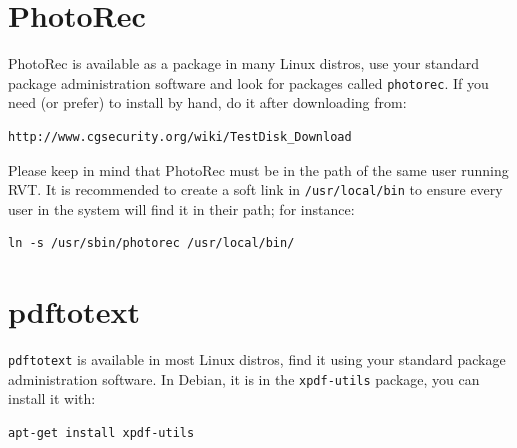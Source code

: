 \documentclass[a4paper,11pt,oneside]{report}
\begin{document}
\section{PhotoRec} \label{anx:photorec}

PhotoRec is available as a package in many Linux distros, use your standard package administration software and look for packages called \texttt{photorec}. If you need (or prefer) to install by hand, do it after downloading from:
\begin{verbatim}
http://www.cgsecurity.org/wiki/TestDisk_Download
\end{verbatim}

Please keep in mind that PhotoRec must be in the path of the same user running RVT. It is recommended to create a soft link in \texttt{/usr/local/bin} to ensure every user in the system will find it in their path; for instance:

\begin{verbatim}
ln -s /usr/sbin/photorec /usr/local/bin/
\end{verbatim}




\section{pdftotext} \label{anx:pdftotext}

\texttt{pdftotext} is available in most Linux distros, find it using your standard package administration software. In Debian, it is in the \texttt{xpdf-utils} package, you can install it with:
\begin{verbatim}
apt-get install xpdf-utils
\end{verbatim}
\end{document}
